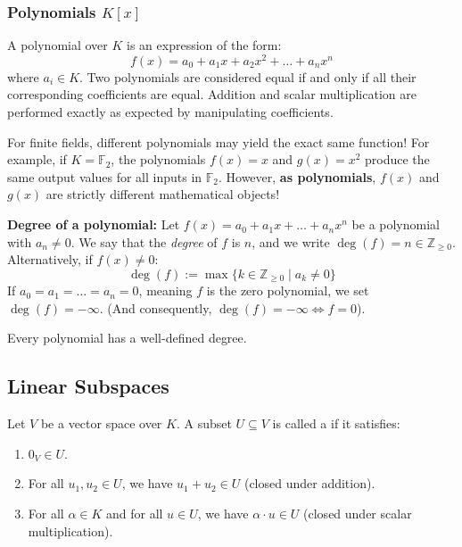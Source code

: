 \subsubsection{Polynomials $K[x]$}
\begin{example}
A polynomial over $K$ is an expression of the form:
\[
f(x) = a_0 + a_1 x + a_2 x^2 + \dots + a_n x^n
\]
where $a_i \in K$. Two polynomials are considered equal if and only if all their corresponding coefficients are equal. Addition and scalar multiplication are performed exactly as expected by manipulating coefficients.

\begin{importantremark}
For finite fields, different polynomials may yield the exact same function! For example, if $K = \mathbb{F}_2$, the polynomials $f(x) = x$ and $g(x) = x^2$ produce the same output values for all inputs in $\mathbb{F}_2$. However, \textbf{as polynomials}, $f(x)$ and $g(x)$ are strictly different mathematical objects!
\end{importantremark}

\textbf{Degree of a polynomial:}
Let $f(x) = a_0 + a_1 x + \dots + a_n x^n$ be a polynomial with $a_n \ne 0$. We say that the \textit{degree} of $f$ is $n$, and we write $\deg(f) = n \in \mathbb{Z}_{\ge 0}$.
Alternatively, if $f(x) \ne 0$:
\[
\deg(f) := \max \{k \in \mathbb{Z}_{\ge 0} \mid a_k \ne 0\}
\]
If $a_0 = a_1 = \dots = a_n = 0$, meaning $f$ is the zero polynomial, we set $\deg(f) = -\infty$. (And consequently, $\deg(f) = -\infty \iff f = 0$).

\begin{remark}
Every polynomial has a well-defined degree.
\end{remark}
\end{example}

\subsection{Linear Subspaces}

\begin{definition}
Let $V$ be a vector space over $K$. A subset $U \subseteq V$ is called a  if it satisfies:
\begin{enumerate}
    \item $0_V \in U$.
    \item For all $u_1, u_2 \in U$, we have $u_1 + u_2 \in U$ (closed under addition).
    \item For all $\alpha \in K$ and for all $u \in U$, we have $\alpha \cdot u \in U$ (closed under scalar multiplication).
\end{enumerate}
\end{definition}

